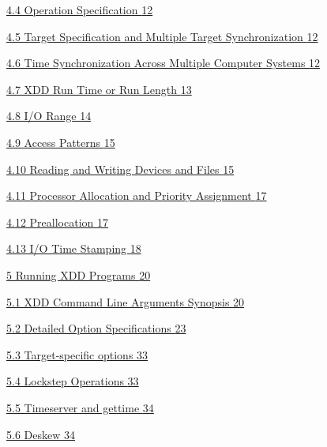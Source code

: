 \hyperref[operation-specification]{4.4 Operation Specification \hyperref[operation-specification]{12}}

\hyperref[target-specification-and-multiple-target-synchronization]{4.5 Target Specification and Multiple Target Synchronization \hyperref[target-specification-and-multiple-target-synchronization]{12}}

\hyperref[time-synchronization-across-multiple-computer-systems]{4.6 Time Synchronization Across Multiple Computer Systems \hyperref[time-synchronization-across-multiple-computer-systems]{12}}

\hyperref[xdd-run-time-or-run-length]{4.7 XDD Run Time or Run Length \hyperref[xdd-run-time-or-run-length]{13}}

\hyperref[io-range]{4.8 I/O Range \hyperref[io-range]{14}}

\hyperref[access-patterns]{4.9 Access Patterns \hyperref[access-patterns]{15}}

\hyperref[reading-and-writing-devices-and-files]{4.10 Reading and Writing Devices and Files \hyperref[reading-and-writing-devices-and-files]{15}}

\hyperref[processor-allocation-and-priority-assignment]{4.11 Processor Allocation and Priority Assignment \hyperref[processor-allocation-and-priority-assignment]{17}}

\hyperref[preallocation]{4.12 Preallocation \hyperref[preallocation]{17}}

\hyperref[io-time-stamping]{4.13 I/O Time Stamping \hyperref[io-time-stamping]{18}}

\hyperref[running-xdd-programs]{5 Running XDD Programs \hyperref[running-xdd-programs]{20}}

\hyperref[xdd-command-line-arguments-synopsis]{5.1 XDD Command Line Arguments Synopsis \hyperref[xdd-command-line-arguments-synopsis]{20}}

\hyperref[detailed-option-specifications]{5.2 Detailed Option Specifications \hyperref[detailed-option-specifications]{23}}

\hyperref[target-specific-options]{5.3 Target-specific options \hyperref[target-specific-options]{33}}

\hyperref[lockstep-operations]{5.4 Lockstep Operations \hyperref[lockstep-operations]{33}}

\hyperref[timeserver-and-gettime]{5.5 Timeserver and gettime \hyperref[timeserver-and-gettime]{34}}

\hyperref[deskew]{5.6 Deskew \hyperref[deskew]{34}}

